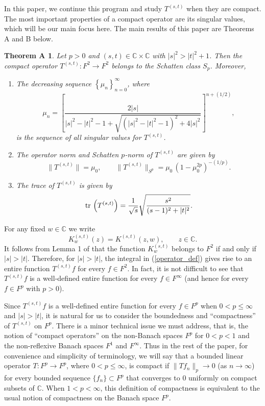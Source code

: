 \documentclass[reqno]{amsart}
\newtheorem*{thma}{Theorem A}
\newcommand{\C}{{\mathbb C}}
\DeclareMathOperator{\tr}{{\rm tr}\,}
\begin{document}
In this paper, we continue this program and study $T^{(s,t)}$ when they 
are compact. The most important properties of a compact operator 
are its singular values, which will be our main focus here.
The main results of this paper are Theorems A and B below.

\begin{thma}
Let $p>0$ and $(s, t)\in\C\times\C$ with $|s|^2>|t|^2+1$. Then the
compact operator $T^{(s,t)}: F^2\to F^2$ belongs to the Schatten class
$S_p$. Moreover,
\begin{enumerate}
\item[(a)] The decreasing sequence $\left\{\mu_n\right\}_{n=0}^\infty$,
where
$$\mu_n=\left[\frac{2|s|}{|s|^2-|t|^2-1+
\sqrt{(|s|^2-|t|^2-1)^2+4|s|^2}}\right]^{n+(1/2)},$$
is the sequence of all singular values for $T^{(s,t)}$.
\item[(b)] The operator norm and Schatten $p$-norm of $T^{(s,t)}$ 
are given by
$$\|T^{(s,t)}\|=\mu_0,\qquad \|T^{(s,t)}\|_{S^p}=
\mu_0\,\left(1-\mu_0^{2p}\right)^{-(1/p)}.$$ 
\item[(c)] The trace of $T^{(s,t)}$ is given by
$$\tr\left(T^{(s,t)}\right)=
\frac{1}{\sqrt{s}}\sqrt{\frac{s^2}{(s-1)^2+|t|^2}}.$$
\end{enumerate}
\end{thma}

For any fixed $w\in\C$ we write
$$K_w^{(s,t)}(z)=K^{(s,t)}(z,w),\qquad z\in\C.$$
It follows from Lemma 1 of \cite{DZ3} that the function $K_w^{(s,t)}$ 
belongs to $F^2$ if and only if $|s|>|t|$. Therefore, for $|s|>|t|$, the 
integral in (\ref{operator_def}) gives rise to an entire function $T^{(s,t)}f$ 
for every $f\in F^2$. In fact, it is not difficult to see that $T^{(s,t)}f$ is a
well-defined entire function for every $f\in F^\infty$ (and hence for every
$f\in F^p$ with $p>0$).

Since $T^{(s,t)}f$ is a well-defined entire function for every $f\in F^p$ 
when $0<p\le\infty$ and $|s|>|t|$, it is natural for us to consider the 
boundedness and ``compactness'' of $T^{(s,t)}$ on $F^p$. There is a 
minor technical issue we must address, that is, the notion of ``compact 
operators'' on the non-Banach spaces $F^p$ for $0<p<1$ and the 
non-reflexive Banach spaces $F^1$ and $F^\infty$. Thus in the rest of 
the paper, for convenience and simplicity of terminology, we will say that 
a bounded linear operator $T: F^p\to F^p$, where $0<p\le\infty$, is 
compact if $\|Tf_n\|_{p}\to0$ (as $n\to\infty$) for every bounded 
sequence $\{f_n\}\subset F^p$ that converges to $0$ uniformly on 
compact subsets of $\C$. When $1<p<\infty$, this definition of 
compactness is equivalent to the usual notion of compactness on the 
Banach space $F^p$.
\end{document}

